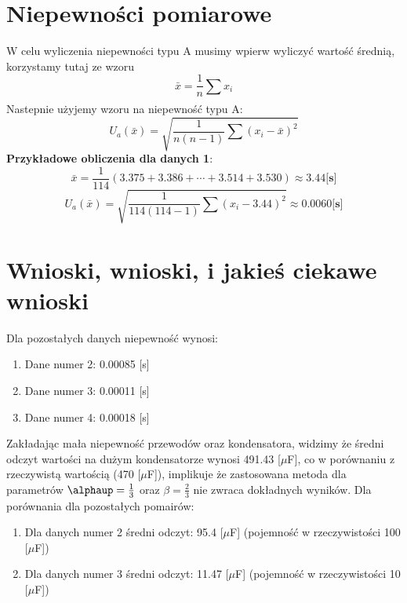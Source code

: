 \documentclass[12pt]{mwrep}
\let\alpha\alphaup
\begin{document}
	\section{Niepewności pomiarowe}%
	\noindent W celu wyliczenia niepewności typu A musimy wpierw wyliczyć wartość średnią, korzystamy tutaj ze wzoru\\
	\begin{equation}
		\bar{x} = \frac{1}{n}\sum_{}^{}x_i
	\end{equation}
	Nastepnie użyjemy wzoru na niepewność typu A:
	\begin{equation}
		U_a(\bar{x}) = \sqrt{\frac{1}{n(n-1)}\sum\left(x_i- \bar{x}\right)^2}
	\end{equation}
	\textbf{Przykładowe obliczenia dla danych 1}:	
	\begin{equation}
		\bar{x} = \frac{1}{114}(3.375+3.386+\cdots+3.514+3.530) \approx 3.44 \textbf{[s]}
	\end{equation}
	\begin{equation}
		U_a(\bar{x}) = \sqrt{\frac{1}{114(114-1)}\sum\left(x_i- 3.44\right)^2} \approx 0.0060 \textbf{[s]}
	\end{equation}
	
	
	\section{Wnioski, wnioski, i jakieś ciekawe wnioski} %
	\noindent Dla pozostałych danych niepewność wynosi:
	\begin{enumerate}
		\item Dane numer 2: 0.00085 [s]
		\item Dane numer 3: 0.00011 [s]
		\item Dane numer 4: 0.00018 [s]
	\end{enumerate}
	Zakładając mała niepewność przewodów oraz kondensatora, widzimy że średni odczyt wartości na dużym kondensatorze wynosi 491.43 [$\mu$F], co w porównaniu z rzeczywistą wartością (470 [$\mu$F]), implikuje że zastosowana metoda dla parametrów $\alpha=\frac{1}{3}$ oraz $\beta=\frac{2}{3}$ nie zwraca dokładnych wyników. Dla porównania dla pozostałych pomairów:
	\begin{enumerate}
		\item Dla danych numer 2 średni odczyt: 95.4 [$\mu$F] (pojemność w rzeczywistości 100 [$\mu$F])
		\item Dla danych numer 3 średni odczyt: 11.47 [$\mu$F] (pojemność w rzeczywistości 10 [$\mu$F])
	\end{enumerate} 
	
\end{document}
